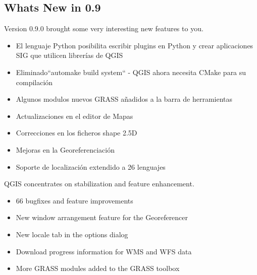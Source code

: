 \subsection{Whats New in 0.9}\label{label_whatsnew}

Version 0.9.0 brought some very interesting new features to you.

\begin{itemize}
\item El lenguaje Python posibilita escribir plugins en Python y crear 
aplicaciones SIG que utilicen librerías de QGIS
\item Eliminado``automake build system`` - QGIS ahora necesita CMake para su 
compilación
\item Algunos modulos nuevos GRASS añadidos a la barra de herramientas
\item Actualizaciones en el editor de Mapas
\item Correcciones en los ficheros shape 2.5D 
\item Mejoras en la Georeferenciación
\item Soporte de localización extendido a 26 lenguajes    
\end{itemize}

QGIS \CURRENT concentrates on stabilization and feature enhancement.

\begin{itemize}
\item 66 bugfixes and feature improvements 
\item New window arrangement feature for the Georeferencer
\item New locale tab in the options dialog
\item Download progress information for WMS and WFS data
\item More GRASS modules added to the GRASS toolbox
\end{itemize}

